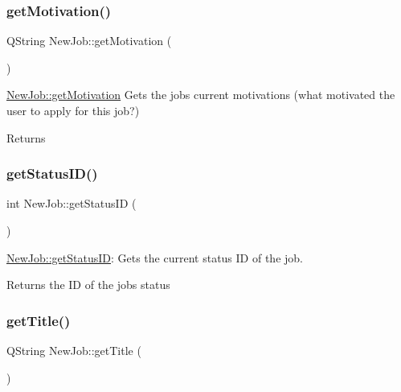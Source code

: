 \subsubsection{\texorpdfstring{get\+Motivation()}{getMotivation()}}
{\footnotesize\ttfamily Q\+String New\+Job\+::get\+Motivation (\begin{DoxyParamCaption}{ }\end{DoxyParamCaption})}



\hyperlink{class_new_job_a665113a114684439ed3705c8c5f8eabf}{New\+Job\+::get\+Motivation} Gets the job\textquotesingle{}s current motivations (what motivated the user to apply for this job?) 

\begin{DoxyReturn}{Returns}

\end{DoxyReturn}
\mbox{\label{class_new_job_aebbe015a22f5dbf60a34c33dd5c5a8e7}} 
\subsubsection{\texorpdfstring{get\+Status\+I\+D()}{getStatusID()}}
{\footnotesize\ttfamily int New\+Job\+::get\+Status\+ID (\begin{DoxyParamCaption}{ }\end{DoxyParamCaption})}



\hyperlink{class_new_job_aebbe015a22f5dbf60a34c33dd5c5a8e7}{New\+Job\+::get\+Status\+ID}\+: Gets the current status ID of the job. 

\begin{DoxyReturn}{Returns}
the ID of the job\textquotesingle{}s status 
\end{DoxyReturn}
\mbox{\label{class_new_job_aa93c07712d80644b828994a01993c27c}} 
\subsubsection{\texorpdfstring{get\+Title()}{getTitle()}}
{\footnotesize\ttfamily Q\+String New\+Job\+::get\+Title (\begin{DoxyParamCaption}{ }\end{DoxyParamCaption})}



